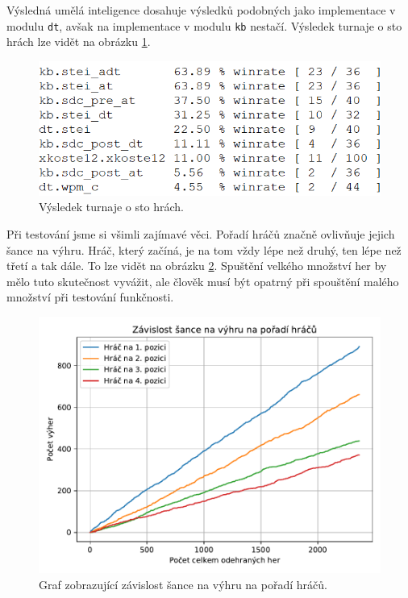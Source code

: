 \documentclass[a4paper,11pt]{article}
\begin{document}
	Výsledná umělá inteligence dosahuje výsledků podobných jako implementace v modulu \texttt{dt}, avšak na implementace v modulu \texttt{kb} nestačí. Výsledek turnaje o sto hrách lze vidět na obrázku \ref{fig:winrate}.
	
	\begin{figure}[h]
		\label{fig:winrate}
		\centering
		\includegraphics[scale=0.7]{winrate.png}
		\caption{Výsledek turnaje o sto hrách.}
	\end{figure}
	
	Při testování jsme si všimli zajímavé věci. Pořadí hráčů značně ovlivňuje jejich šance na výhru. Hráč, který začíná, je na tom vždy lépe než druhý, ten lépe než třetí a tak dále. To lze vidět na obrázku \ref{fig:order}. Spuštění velkého množství her by mělo tuto skutečnost vyvážit, ale člověk musí být opatrný při spouštění malého množství při testování funkčnosti.
	
	\begin{figure}[h]
		\label{fig:order}
		\centering
		\includegraphics[scale=0.65]{win_prob.pdf}
		\caption{Graf zobrazující závislost šance na výhru na pořadí hráčů.}
	\end{figure}
	
\end{document}
